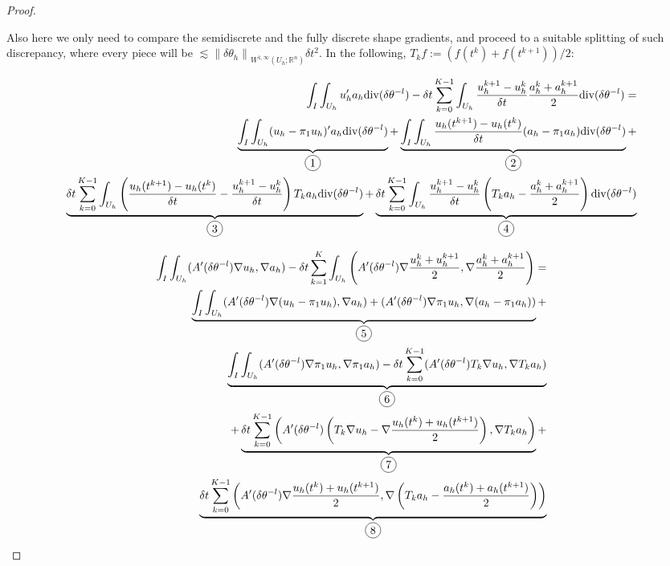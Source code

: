\documentclass[english,a4paper,9pt,oneside]{scrbook}	%
\theoremstyle{break}
\newenvironment{mproof}[1][\proofname]{%
  \begin{proof}[#1]$ $\par\nobreak\ignorespaces
}{%
  \end{proof}
}
\renewcommand*{\proofname}{Proof}
\theoremstyle{remark}
\newcommand{\mR}{\mathbb{R}}
\newcommand{\norm}[1]{\left\lVert#1\right\rVert}
\newcommand{\te}{\theta}
\newcommand{\dive}{\text{div}}
\newcommand*\circled[1]{\tikz[baseline=(char.base)]{
            \node[shape=circle,draw,inner sep=2pt] (char) {#1};}}
\begin{document}
\begin{mproof}
Also here we only need to compare the semidiscrete and the fully discrete shape gradients, and proceed to a suitable splitting of such discrepancy, where every piece will be $\lesssim \norm{\delta \te_h}_{W^{1,\infty}(U_h;\mR^n)} \delta t^2$. In the following, $T_k f := (f(t^k)+f(t^{k+1}))/2$:

\begin{align*}
\int_I\int_{U_h}u_h'a_h\dive(\delta \te^{-l})-\delta t \sum_{k=0}^{K-1} \int_{U_h} \frac{u_h^{k+1}-u_h^{k}}{\delta t}\frac{a_h^k+a_h^{k+1}}{2} \dive(\delta \te^{-l}) =  \\
\underbrace{\int_I\int_{U_h}(u_h-\pi_1 u_h)'a_h\dive(\delta \te^{-l})}_{\circled{1}} + \underbrace{\int_I\int_{U_h}\frac{u_h(t^{k+1})-u_h(t^{k})}{\delta t} (a_h-\pi_1 a_h)\dive(\delta \te^{-l})}_{\circled{2}} +\\
\underbrace{\delta t \sum_{k=0}^{K-1} \int_{U_h}\left (\frac{u_h(t^{k+1})-u_h(t^{k})}{\delta t} - \frac{u_h^{k+1}-u_h^{k}}{\delta t}\right)  T_k a_h   \dive(\delta \te^{-l})}_{\circled{3}} + \underbrace{ \delta t \sum_{k=0}^{K-1} \int_{U_h}\frac{u_h^{k+1}-u_h^{k}}{\delta t} \left ( T_k a_h 
- \frac{a_h^k+a_h^{k+1}}{2}\right )  \dive(\delta \te^{-l})}_{\circled{4}} 
\end{align*}

\begin{align*}
\int_I \int_{U_h} (A'(\delta \te^{-l})\nabla u_h,\nabla a_h) - \delta t \sum_{k=1}^K \int_{U_h} \left(A'(\delta \te^{-l})\nabla \frac{u_h^k+ u_h^{k+1}}{2} ,\nabla \frac{a_h^{k}+a_h^{k+1}}{2}\right ) = \\
\underbrace{\int_I \int_{U_h} (A'(\delta \te^{-l})\nabla (u_h-\pi_1 u_h),\nabla a_h) +  (A'(\delta \te^{-l})\nabla \pi_1 u_h,\nabla (a_h-\pi_1 a_h))}_{\circled{5}}+\\\underbrace{\int_I \int_{U_h} (A'(\delta \te^{-l})\nabla \pi_1 u_h,\nabla \pi_1 a_h)- \delta t \sum_{k=0}^{K-1} (A'(\delta \te^{-l})T_k \nabla u_h,\nabla T_k a_h)}_{\circled{6}} \\ 
+\underbrace{\delta t \sum_{k=0}^{K-1} \left (A'(\delta \te^{-l})\left ( T_k \nabla u_h - \nabla \frac{u_h(t^{k})+u_h(t^{k+1})}{2}\right) ,\nabla T_k a_h\right )}_{\circled{7}} +\\ \underbrace{\delta t \sum_{k=0}^{K-1} \left (A'(\delta \te^{-l})\nabla \frac{u_h(t^{k})+u_h(t^{k+1})}{2},\nabla \left ( T_k a_h - \frac{a_h(t^{k})+a_h(t^{k+1})}{2} \right)\right )}_{\circled{8}}
\end{align*}


\end{mproof}
\end{document}
